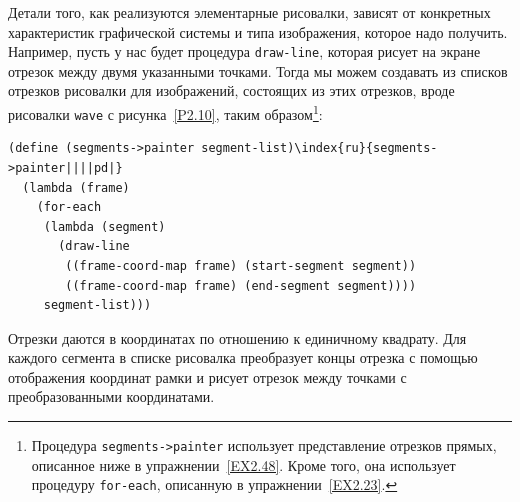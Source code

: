 Детали того, как реализуются элементарные рисовалки,
зависят от конкретных характеристик графической системы и типа
изображения, которое надо получить.  Например, пусть у нас будет
процедура {\tt draw-line},
которая рисует на экране отрезок между 
двумя указанными точками.  Тогда мы можем создавать из списков
отрезков рисовалки для изображений, состоящих из этих отрезков, вроде рисовалки
{\tt wave} с рисунка~\ref{P2.10}, таким образом\footnote{Процедура {\tt segments->painter} использует
представление отрезков прямых, описанное ниже в упражнении~\ref{EX2.48}.  Кроме того, она использует
процедуру {\tt for-each}, описанную в упражнении~\ref{EX2.23}.
}:

\begin{Verbatim}[fontsize=\small]
(define (segments->painter segment-list)\index{ru}{segments->painter||||pd|}
  (lambda (frame)
    (for-each
     (lambda (segment)
       (draw-line
        ((frame-coord-map frame) (start-segment segment))
        ((frame-coord-map frame) (end-segment segment))))
     segment-list)))
\end{Verbatim}
Отрезки даются в координатах по отношению к единичному квадрату.  Для
каждого сегмента в списке рисовалка преобразует концы отрезка с
помощью отображения координат рамки и рисует отрезок между точками с
преобразованными координатами.

